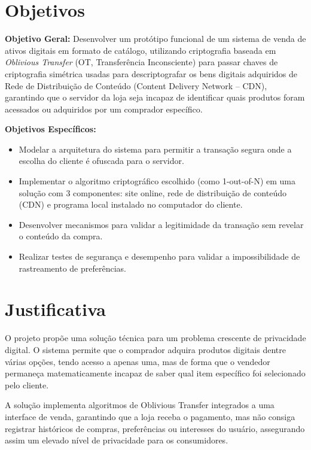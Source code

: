 \section{Objetivos}

\textbf{Objetivo Geral:} Desenvolver um protótipo funcional de um sistema de
venda de ativos digitais em formato de catálogo, utilizando criptografia
baseada em \emph{Oblivious Transfer} (OT, Transferência Inconsciente) para passar chaves
de criptografia simétrica usadas para descriptografar os bens digitais
adquiridos de Rede de Distribuição de Conteúdo (Content Delivery Network --
CDN), garantindo que o servidor da loja seja incapaz de identificar quais
produtos foram acessados ou adquiridos por um comprador específico.

\textbf{Objetivos Específicos:}

\begin{itemize}
\item Modelar a arquitetura do sistema para permitir a transação segura onde a
escolha do cliente é ofuscada para o servidor.
\item Implementar o algoritmo criptográfico escolhido (como 1-out-of-N) em uma
solução com 3 componentes: site online, rede de distribuição de conteúdo (CDN)
e programa local instalado no computador do cliente.
\item Desenvolver mecanismos para validar a legitimidade da transação sem
revelar o conteúdo da compra.
\item Realizar testes de segurança e desempenho para validar a impossibilidade
de rastreamento de preferências.
\end{itemize}

\section{Justificativa}

O projeto propõe uma solução técnica para um problema crescente de privacidade
digital. O sistema permite que o comprador adquira produtos digitais dentre
várias opções, tendo acesso a apenas uma, mas de forma que o vendedor
permaneça matematicamente incapaz de saber qual item específico foi
selecionado pelo cliente.

A solução implementa algoritmos de Oblivious Transfer
integrados a uma interface de venda, garantindo que a loja receba o pagamento,
mas não consiga registrar históricos de compras, preferências ou interesses do
usuário, assegurando assim um elevado nível de privacidade para os
consumidores.

